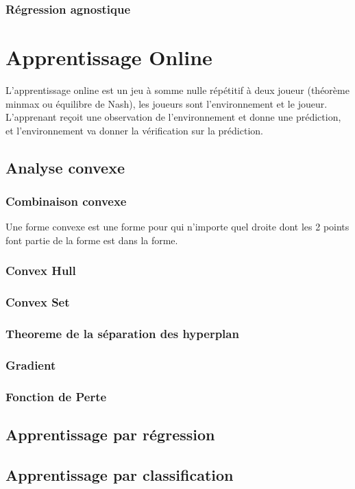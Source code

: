 \subsection{Régression agnostique}

\pagebreak
\chapter{Apprentissage Online}

L'apprentissage online est un jeu à somme nulle répétitif à deux joueur (théorème minmax ou équilibre de Nash), les joueurs sont l'environnement et le joueur.\\
L'apprenant reçoit une observation de l'environnement et donne une prédiction, et l'environnement va donner la vérification sur la prédiction.\\

\pagebreak
\section{Analyse convexe}
\subsection{Combinaison convexe}

Une forme convexe est une forme pour qui n'importe quel droite dont les 2 points font partie de la forme est dans la forme.\\

\subsection{Convex Hull}


\subsection{Convex Set}



\subsection{Theoreme de la séparation des hyperplan}


\subsection{Gradient}


\subsection{Fonction de Perte}


\section{Apprentissage par régression}

\section{Apprentissage par classification}

\pagebreak

